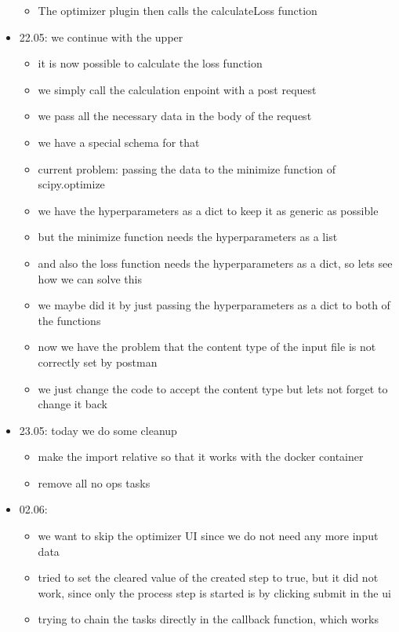 \documentclass[
  a4paper,  %
  twoside,  %
  bibliography=totoc,
  headsepline,
  cleardoublepage=empty,
  parskip=half,
  draft=false
]{scrbook}
\begin{document}
\begin{itemize}
\begin{itemize}
    \item The optimizer plugin then calls the calculateLoss function
  \end{itemize}
  \item 22.05: we continue with the upper
  \begin{itemize}
    \item it is now possible to calculate the loss function
    \item we simply call the calculation enpoint with a post request
    \item we pass all the necessary data in the body of the request
    \item we have a special schema for that
    \item current problem: passing the data to the minimize function of scipy.optimize
    \item we have the hyperparameters as a dict to keep it as generic as possible
    \item but the minimize function needs the hyperparameters as a list
    \item and also the loss function needs the hyperparameters as a dict, so lets see how we can solve this
    \item we maybe did it by just passing the hyperparameters as a dict to both of the functions
    \item now we have the problem that the content type of the input file is not correctly set by postman
    \item we just change the code to accept the content type but lets not forget to change it back
  \end{itemize}
  \item 23.05: today we do some cleanup
  \begin{itemize}
    \item make the import relative so that it works with the docker container
    \item remove all no ops tasks
  \end{itemize}
  \item 02.06:
  \begin{itemize}
    \item we want to skip the optimizer UI since we do not need any more input data
    \item tried to set the cleared value of the created step to true, but it did not work, since only the process step is started is by clicking submit in the ui
    \item trying to chain the tasks directly in the callback function, which works

\end{itemize}
\end{itemize}
\end{document}
